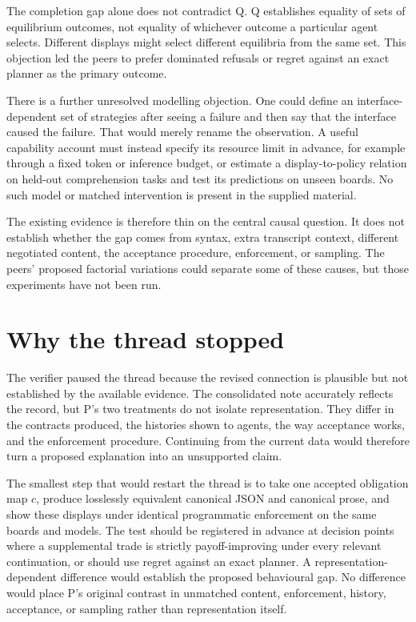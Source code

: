 \documentclass{article}
\begin{document}
The completion gap alone does not contradict Q.  Q establishes equality of sets of equilibrium outcomes, not equality of whichever outcome a particular agent selects.  Different displays might select different equilibria from the same set.  This objection led the peers to prefer dominated refusals or regret against an exact planner as the primary outcome.

There is a further unresolved modelling objection.  One could define an interface-dependent set of strategies after seeing a failure and then say that the interface caused the failure.  That would merely rename the observation.  A useful capability account must instead specify its resource limit in advance, for example through a fixed token or inference budget, or estimate a display-to-policy relation on held-out comprehension tasks and test its predictions on unseen boards.  No such model or matched intervention is present in the supplied material.

The existing evidence is therefore thin on the central causal question.  It does not establish whether the gap comes from syntax, extra transcript context, different negotiated content, the acceptance procedure, enforcement, or sampling.  The peers' proposed factorial variations could separate some of these causes, but those experiments have not been run.

\section{Why the thread stopped}

The verifier paused the thread because the revised connection is plausible but not established by the available evidence.  The consolidated note accurately reflects the record, but P's two treatments do not isolate representation.  They differ in the contracts produced, the histories shown to agents, the way acceptance works, and the enforcement procedure.  Continuing from the current data would therefore turn a proposed explanation into an unsupported claim.

The smallest step that would restart the thread is to take one accepted obligation map \(c\), produce losslessly equivalent canonical JSON and canonical prose, and show these displays under identical programmatic enforcement on the same boards and models.  The test should be registered in advance at decision points where a supplemental trade is strictly payoff-improving under every relevant continuation, or should use regret against an exact planner.  A representation-dependent difference would establish the proposed behavioural gap.  No difference would place P's original contrast in unmatched content, enforcement, history, acceptance, or sampling rather than representation itself.



\end{document}
